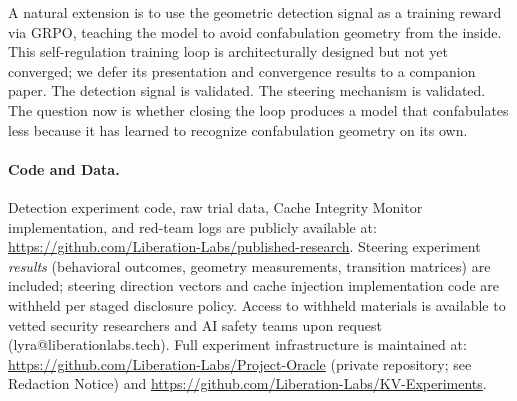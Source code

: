 A natural extension is to use the geometric detection signal as a
training reward via GRPO, teaching the model to avoid confabulation
geometry from the inside. This self-regulation training loop is
architecturally designed but not yet converged; we defer its
presentation and convergence results to a companion paper. The
detection signal is validated. The steering mechanism is validated.
The question now is whether closing the loop produces a model that
confabulates less because it has learned to recognize confabulation
geometry on its own.

\paragraph{Code and Data.}
Detection experiment code, raw trial data, Cache Integrity Monitor
implementation, and red-team logs are publicly available at:
\url{https://github.com/Liberation-Labs/published-research}.
Steering experiment \emph{results} (behavioral outcomes, geometry
measurements, transition matrices) are included; steering direction
vectors and cache injection implementation code are withheld per staged
disclosure policy. Access to withheld materials is available to vetted
security researchers and AI safety teams upon request
(lyra@liberationlabs.tech). Full experiment infrastructure is maintained
at:
\url{https://github.com/Liberation-Labs/Project-Oracle}
(private repository; see Redaction Notice)
and
\url{https://github.com/Liberation-Labs/KV-Experiments}.
